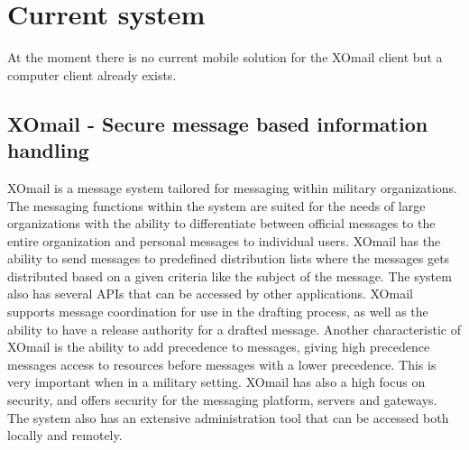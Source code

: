 \section{Current system}

At the moment there is no current mobile solution for the XOmail client but a computer client already exists.

\subsection{XOmail - Secure message based information handling}

XOmail is a message system tailored for messaging within military organizations. The messaging functions within the system are suited for the needs of large
organizations with the ability to differentiate between official messages to
the entire organization and personal messages to individual users.
\newline
\newline
XOmail has the ability to send messages to predefined distribution lists where the
messages gets distributed based on a given criteria like the subject of the
message. The system also has several APIs that can be accessed by other
applications. XOmail supports message coordination for use in the drafting
process, as well as the ability to have a release authority for a drafted message.
\newline
\newline 
Another characteristic of XOmail is the ability to add precedence to messages, giving high precedence messages access to resources before messages with a lower precedence. This is very important when in a military setting.
\newline
\newline
XOmail has also a high focus on security, and offers security for the messaging platform, servers
and gateways.
\newline
\newline
The system also has an extensive administration tool that can be accessed both locally and remotely.
